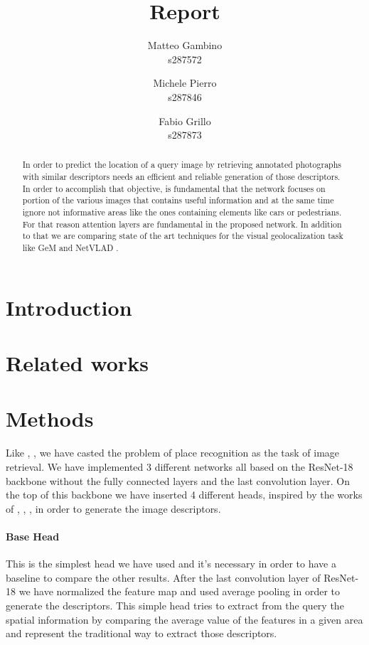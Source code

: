 \documentclass[10pt,twocolumn,letterpaper]{article}
\begin{document}
\title{Report}

\author{Matteo Gambino\\
s287572
\and
Michele Pierro\\
s287846
\and
Fabio Grillo\\
s287873
}
\maketitle

\begin{abstract}
   In order to predict the location of a query image by retrieving annotated photographs with 
   similar descriptors needs an efficient and reliable generation of those descriptors. 
   In order to accomplish that objective, is fundamental that the network focuses on portion
   of the various images that contains useful information and at the same time ignore not 
   informative areas like the ones containing elements like cars or pedestrians. For that 
   reason attention layers are fundamental in the proposed network. In addition to that we 
   are comparing state of the art techniques for the visual geolocalization task like GeM \cite{GEM}
   and NetVLAD \cite{NETVLAD}.
\end{abstract}

\section{Introduction}

\section{Related works}
\section{Methods}
Like \cite{GEM}, \cite{NETVLAD}, \cite{CRN} we have casted the problem of place recognition as the task of image
retrieval. We have implemented 3 different networks all based on the ResNet-18 \cite{resnet} backbone
without the fully connected layers and the last convolution layer. On the top of this backbone we 
have inserted 4 different heads, inspired by the works of \cite{GEM}, \cite{NETVLAD}, \cite{CRN}, in order
to generate the image descriptors. 
\paragraph*{Base Head}
This is the simplest head we have used and it's necessary in order to have a baseline to compare the other
results. After the last convolution layer of ResNet-18 we have normalized the feature map and used average 
pooling in order to generate the descriptors. This simple head tries to extract from the query the spatial
information by comparing the average value of the features in a given area and represent the traditional way 
to extract those descriptors.
\end{document}
